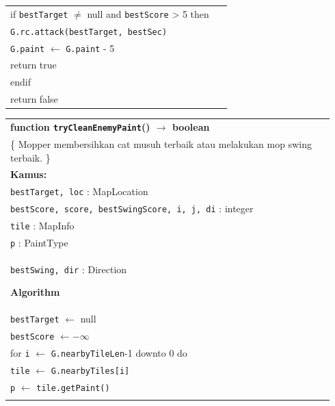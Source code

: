 \documentclass{article}
\newenvironment{pseudobox}
{
\centering
\begin{longtable}{|p{0.94\linewidth}|}
\hline
}
{
\\ \hline
\end{longtable}
\vspace{0.05cm}
}
\begin{document}
\begin{enumerate}[label=\alph*.]
\begin{enumerate}[label=\alph*.]
\begin{pseudobox}
\hspace*{1.5em}if \texttt{bestTarget} $\neq$ null and \texttt{bestScore} > 5 then \\
\hspace*{3em}\texttt{G.rc.attack(bestTarget, bestSec)} \\
\hspace*{3em}\texttt{G.paint} $\leftarrow$ \texttt{G.paint} - 5 \\
\hspace*{3em}return true \\
\hspace*{1.5em}endif \\

\hspace*{1.5em}return false
\end{pseudobox}

\begin{pseudobox}
\textbf{function \texttt{tryCleanEnemyPaint}() $\rightarrow$ boolean} \\
\{ Mopper membersihkan cat musuh terbaik atau melakukan mop swing terbaik. \}\\

\textbf{Kamus:} \\
\hspace*{1.5em}\texttt{bestTarget, loc} : MapLocation \\
\hspace*{1.5em}\texttt{bestScore, score, bestSwingScore, i, j, di} : integer \\
\hspace*{1.5em}\texttt{tile} : MapInfo \\
\hspace*{1.5em}\texttt{p} : PaintType \\
\hspace*{1.5em}\texttt{bestSwing, dir} : Direction

\textbf{Algorithm} \\
\hspace*{1.5em}\texttt{bestTarget} $\leftarrow$ null \\
\hspace*{1.5em}\texttt{bestScore} $\leftarrow -\infty$ \\

\hspace*{1.5em}for \texttt{i} $\leftarrow$ \texttt{G.nearbyTileLen}-1 downto 0 do \\
\hspace*{3em}\texttt{tile} $\leftarrow$ \texttt{G.nearbyTiles[i]} \\
\hspace*{3em}\texttt{p} $\leftarrow$ \texttt{tile.getPaint()} \\


\end{pseudobox}
\end{enumerate}
\end{enumerate}
\end{document}
